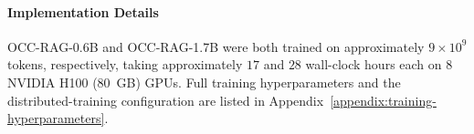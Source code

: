 \paragraph{Implementation Details}
OCC-RAG-0.6B and OCC-RAG-1.7B were both trained on approximately $9 \times 10^9$ tokens, respectively, taking approximately $17$ and $28$ wall-clock hours each on $8$ NVIDIA H100 (80~GB) GPUs. Full training hyperparameters and the distributed-training configuration are listed in Appendix~\ref{appendix:training-hyperparameters}.
